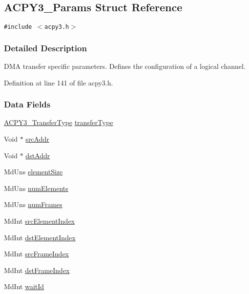 \hypertarget{struct_a_c_p_y3___params}{
\subsection{ACPY3\_\-Params Struct Reference}
\label{struct_a_c_p_y3___params}
}
{\tt \#include $<$acpy3.h$>$}



\subsubsection{Detailed Description}
DMA transfer specific parameters. Defines the configuration of a logical channel. 



Definition at line 141 of file acpy3.h.\subsubsection*{Data Fields}
\begin{CompactItemize}
\item 
\hyperlink{group___d_s_p_a_c_p_y3_gbe2d02fcbde983c823b138f20667cbfc}{ACPY3\_\-Transfer\-Type} \hyperlink{struct_a_c_p_y3___params_6c3d7890c527cbdaaf381bde2850c01c}{transfer\-Type}
\item 
Void $\ast$ \hyperlink{struct_a_c_p_y3___params_856068e9bcada2a38df9704fac8cdcce}{src\-Addr}
\item 
Void $\ast$ \hyperlink{struct_a_c_p_y3___params_5af0ce6af53e9072085a2e7d358469af}{dst\-Addr}
\item 
Md\-Uns \hyperlink{struct_a_c_p_y3___params_4bccffd6c879b24cdf4199ca6d4cb96e}{element\-Size}
\item 
Md\-Uns \hyperlink{struct_a_c_p_y3___params_25aedccf3cbee0af1a8c051af3a03fe1}{num\-Elements}
\item 
Md\-Uns \hyperlink{struct_a_c_p_y3___params_91cb11498468c82cdbcdc41a7584e033}{num\-Frames}
\item 
Md\-Int \hyperlink{struct_a_c_p_y3___params_9931ebb9b098d4c4f86189790d4daf93}{src\-Element\-Index}
\item 
Md\-Int \hyperlink{struct_a_c_p_y3___params_3c697084d1170b24a3f4160470ab3b0c}{dst\-Element\-Index}
\item 
Md\-Int \hyperlink{struct_a_c_p_y3___params_a55f98d127d647472af9751ca1d780aa}{src\-Frame\-Index}
\item 
Md\-Int \hyperlink{struct_a_c_p_y3___params_4cb42bfade573225a65fc3f6d75c0b68}{dst\-Frame\-Index}
\item 
Md\-Int \hyperlink{struct_a_c_p_y3___params_c04bb0a91f1c3f8e8a833fe7e28f7770}{wait\-Id}
\end{CompactItemize}


